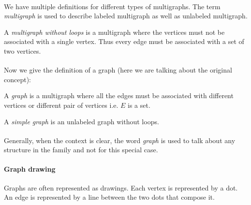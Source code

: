 \paragraph{}
We have multiple definitions for different types of multigraphs. The term \textit{multigraph} is used to describe labeled multigraph as well as unlabeled multigraph.

\begin{definition}
  A \textit{multigraph without loops} is a multigraph where the vertices must not be associated with a single vertex. Thus every edge must be associated with a set of two vertices.
\end{definition}

\paragraph{}
Now we give the definition of a graph (here we are talking about the original concept):

\begin{definition}[Graph]
  A \textit{graph} is a multigraph where all the edges must be associated with different vertices or different pair of vertices i.e. $E$ is a set.
\end{definition}

\begin{definition}
  A \textit{simple graph} is an unlabeled graph without loops.
\end{definition}

\paragraph{}
Generally, when the context is clear, the word \textit{graph} is used to talk about any structure in the family and not for this special case.

\paragraph{}
\textbf{Graph drawing}

\paragraph{}
Graphs are often represented as drawings.  Each vertex is represented by a dot. An edge is represented by a line between the two dots that compose it.

